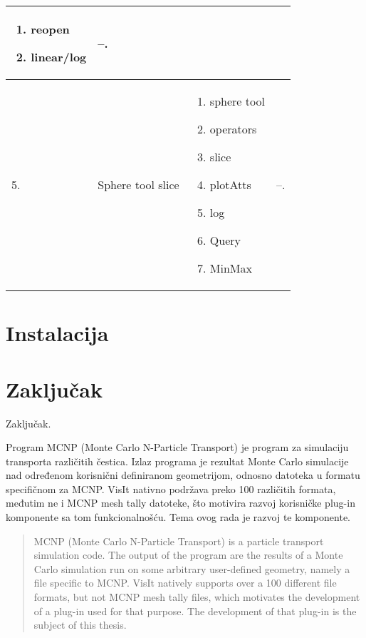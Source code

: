 \documentclass[times, utf8, zavrsni]{fer}
\begin{document}
\begin{longtable}{|l|p{80pt}|p{100pt}|p{120pt}|}
\begin{enumerate}
    \item reopen
    \item linear/log
\end{enumerate}
& --.\\
\hline
5. & Sphere tool slice & \begin{enumerate}
	\item sphere tool    
    \item operators
    \item slice
    \item plotAtts
    \item log
    \item Query
    \item MinMax
\end{enumerate}
& --.\\
\hline
\end{longtable}
	


\chapter{Instalacija}

\chapter{Zaključak}
Zaključak.




\begin{sazetak}
Program MCNP (Monte Carlo N-Particle Transport) je program za simulaciju transporta različitih čestica.
Izlaz programa je rezultat Monte Carlo simulacije nad određenom korisnični definiranom geometrijom, odnosno datoteka u formatu specifičnom za MCNP.
VisIt nativno podržava preko 100 različitih formata, međutim ne i MCNP mesh tally datoteke, što motivira razvoj korisničke plug-in komponente sa tom funkcionalnošću.
Tema ovog rada je razvoj te komponente.

\end{sazetak}

\begin{abstract}
MCNP (Monte Carlo N-Particle Transport) is a particle transport simulation code.
The output of the program are the results of a Monte Carlo simulation run on some arbitrary user-defined geometry, namely a file specific to MCNP.
VisIt natively supports over a 100 different file formats, but not MCNP mesh tally files, which motivates the development of a plug-in used for that purpose.
The development of that plug-in is the subject of this thesis. 

\end{abstract}
\end{document}
